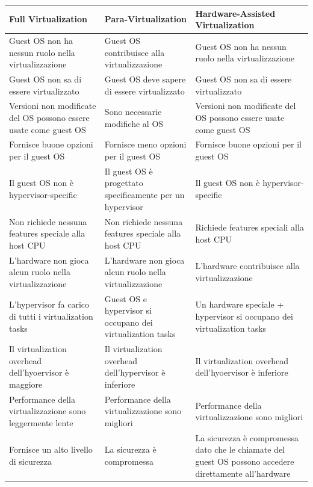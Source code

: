 \documentclass{article}
\begin{document}
\begin{table}[H]
    \begin{tabularx}{\linewidth}{X | X | X}
    \hline
    \textbf{Full Virtualization} & \textbf{Para-Virtualization} &
    \textbf{Hardware-Assisted Virtualization}\\ [0.5ex]
    \hline\hline
    Guest OS non ha nessun ruolo nella virtualizzazione &
    Guest OS contribuisce alla virtualizzazione &
    Guest OS non ha nessun ruolo nella virtualizzazione\\
    \hline
    Guest OS non sa di essere virtualizzato &
    Guest OS deve sapere di essere virtualizzato &
    Guest OS non sa di essere virtualizzato \\
    \hline
    Versioni non modificate del OS possono essere usate come guest OS & 
    Sono necessarie modifiche al OS &
    Versioni non modificate del OS possono essere usate come guest OS \\
    \hline
    Fornisce buone opzioni per il guest OS & 
    Fornisce meno opzioni per il guest OS &
    Fornisce buone opzioni per il guest OS \\
    \hline
    Il guest OS non è hypervisor-specific & 
    Il guest OS è progettato specificamente per un hypervisor &
    Il guest OS non è hypervisor-specific \\ 
    \hline
    Non richiede nessuna features speciale alla host CPU &
    Non richiede nessuna features speciale alla host CPU &
    Richiede features speciali alla host CPU \\
    \hline
    L’hardware non gioca alcun ruolo nella virtualizzazione &
    L’hardware non gioca alcun ruolo nella virtualizzazione &
    L’hardware contribuisce alla virtualizzazione \\
    \hline
    L’hypervisor fa carico di tutti i virtualization tasks &
    Guest OS e hypervisor si occupano dei virtualization tasks &
    Un hardware speciale + hypervisor si occupano dei virtualization tasks \\
    \hline
    Il virtualization overhead dell’hyoervisor è maggiore &
    Il virtualization overhead dell’hypervisor è inferiore &
    Il virtualization overhead dell’hyoervisor è inferiore \\
    \hline
    Performance della virtualizzazione sono leggermente lente &
    Performance della virtualizzazione sono migliori &
    Performance della virtualizzazione sono migliori \\
    \hline
    Fornisce un alto livello di sicurezza &
    La sicurezza è compromessa &
    La sicurezza è compromessa dato che le chiamate del guest OS possono accedere direttamente all’hardware \\ [1ex] 
    \end{tabularx}
\end{table}
\end{document}
